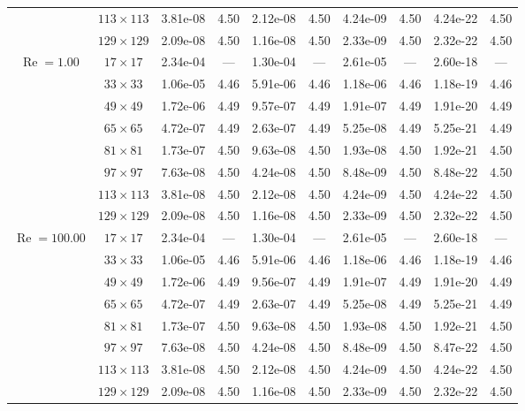 \documentclass[preprint, 12pt]{elsarticle}
\begin{document}
{\begin{center}
\begin{table}[H]
{\begin{tabular*}{\textwidth}{@{\extracolsep\fill}cccccccccc@{}}
    & $113\times 113$ & 3.81e-08 & 4.50 & 2.12e-08 & 4.50 & 4.24e-09 & 4.50 & 4.24e-22 & 4.50 \\
    & $129\times 129$ & 2.09e-08 & 4.50 & 1.16e-08 & 4.50 & 2.33e-09 & 4.50 & 2.32e-22 & 4.50 \\
    \hline\hline
    \multirow{7}{*}{$\operatorname{Re}=1.00$} & $17\times 17$ & 2.34e-04 & --- & 1.30e-04 & --- & 2.61e-05 & --- & 2.60e-18 & --- \\
    & $33\times 33$ & 1.06e-05 & 4.46 & 5.91e-06 & 4.46 & 1.18e-06 & 4.46 & 1.18e-19 & 4.46 \\
    & $49\times 49$ & 1.72e-06 & 4.49 & 9.57e-07 & 4.49 & 1.91e-07 & 4.49 & 1.91e-20 & 4.49 \\
    \multirow{3}{*}{$\operatorname{Wi}=10$} & $65\times 65$ & 4.72e-07 & 4.49 & 2.63e-07 & 4.49 & 5.25e-08 & 4.49 & 5.25e-21 & 4.49 \\
    & $81\times 81$ & 1.73e-07 & 4.50 & 9.63e-08 & 4.50 & 1.93e-08 & 4.50 & 1.92e-21 & 4.50 \\
    & $97\times 97$ & 7.63e-08 & 4.50 & 4.24e-08 & 4.50 & 8.48e-09 & 4.50 & 8.48e-22 & 4.50 \\
    & $113\times 113$ & 3.81e-08 & 4.50 & 2.12e-08 & 4.50 & 4.24e-09 & 4.50 & 4.24e-22 & 4.50 \\
    & $129\times 129$ & 2.09e-08 & 4.50 & 1.16e-08 & 4.50 & 2.33e-09 & 4.50 & 2.32e-22 & 4.50 \\
    \hline
    \multirow{7}{*}{$\operatorname{Re}=100.00$} & $17\times 17$ & 2.34e-04 & --- & 1.30e-04 & --- & 2.61e-05 & --- & 2.60e-18 & --- \\
    & $33\times 33$ & 1.06e-05 & 4.46 & 5.91e-06 & 4.46 & 1.18e-06 & 4.46 & 1.18e-19 & 4.46 \\
    & $49\times 49$ & 1.72e-06 & 4.49 & 9.56e-07 & 4.49 & 1.91e-07 & 4.49 & 1.91e-20 & 4.49 \\
    \multirow{3}{*}{$\operatorname{Wi}=10$} & $65\times 65$ & 4.72e-07 & 4.49 & 2.63e-07 & 4.49 & 5.25e-08 & 4.49 & 5.25e-21 & 4.49 \\
    & $81\times 81$ & 1.73e-07 & 4.50 & 9.63e-08 & 4.50 & 1.93e-08 & 4.50 & 1.92e-21 & 4.50 \\
    & $97\times 97$ & 7.63e-08 & 4.50 & 4.24e-08 & 4.50 & 8.48e-09 & 4.50 & 8.47e-22 & 4.50 \\
    & $113\times 113$ & 3.81e-08 & 4.50 & 2.12e-08 & 4.50 & 4.24e-09 & 4.50 & 4.24e-22 & 4.50 \\
    & $129\times 129$ & 2.09e-08 & 4.50 & 1.16e-08 & 4.50 & 2.33e-09 & 4.50 & 2.32e-22 & 4.50 \\

\end{tabular*}}
\end{table}
\end{center}}
\end{document}
